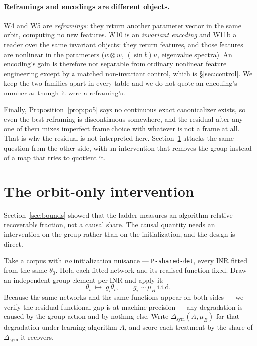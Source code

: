 \documentclass[10pt,letterpaper]{article}
\theoremstyle{definition}
\begin{document}
\paragraph{Reframings and encodings are different objects.} W4 and W5 are \emph{reframings}: they
return another parameter vector in the same orbit, computing no new features. W10 is an
\emph{invariant encoding} and W11b a reader over the same invariant objects: they return features,
and those features are nonlinear in the parameters ($w \otimes w$, $(\sin b)u$, eigenvalue spectra).
An encoding's gain is therefore not separable from ordinary nonlinear feature engineering except by
a matched non-invariant control, which is \S\ref{sec:control}. We keep the two families apart in
every table and we do not quote an encoding's number as though it were a reframing's.

Finally, Proposition~\ref{prop:po5} says no continuous exact canonicalizer exists, so even the best
reframing is discontinuous somewhere, and the residual after any one of them mixes imperfect frame
choice with whatever is not a frame at all. That is why the residual is not interpreted here.
Section~\ref{sec:orbit} attacks the same question from the other side, with an intervention that
removes the group instead of a map that tries to quotient it.

\section{The orbit-only intervention}\label{sec:orbit}

Section~\ref{sec:bounds} showed that the ladder measures an algorithm-relative recoverable
fraction, not a causal share. The causal quantity needs an intervention on the group rather than
on the initialization, and the design is direct.

Take a corpus with \emph{no} initialization nuisance --- \texttt{P-shared-det}, every INR fitted
from the same $\theta_0$. Hold each fitted network and its realised function fixed. Draw an
independent group element per INR and apply it:
\begin{equation}
\theta_i \;\longmapsto\; g_i\theta_i, \qquad g_i \sim \mu_B \ \text{i.i.d.}
\label{eq:orbit-intervention}
\end{equation}
Because the same networks and the same functions appear on both sides --- we verify the residual
functional gap is at machine precision --- any degradation is caused by the group action and by
nothing else. Write $\Delta_{\mathrm{sym}}(A,\mu_B)$ for that degradation under learning algorithm
$A$, and score each treatment by the share of $\Delta_{\mathrm{sym}}$ it recovers.
\end{document}
